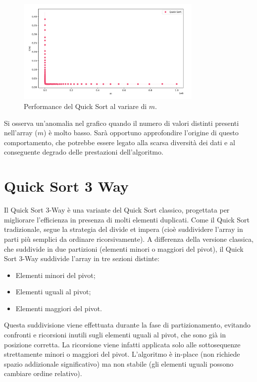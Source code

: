 \documentclass[a4paper, 12pt, oneside]{book}
\begin{document}
\begin{figure}[H]
    \centering
    \includegraphics[width=0.8\textwidth]{images/grafico_quick_sort_m.png}
    \caption{Performance del Quick Sort al variare di \(m\).}
    \label{fig:quick_sort_m}
\end{figure}

\noindent Si osserva un'anomalia nel grafico quando il numero di valori distinti presenti nell'array (\(m\)) è molto basso. Sarà opportuno approfondire l'origine di questo comportamento, che potrebbe essere legato alla scarsa diversità dei dati e al conseguente degrado delle prestazioni dell'algoritmo.


\chapter{Quick Sort 3 Way}\label{chap:Quick Sort 3 Way} %

Il Quick Sort 3-Way è una variante del Quick Sort classico, progettata per migliorare l'efficienza in presenza di molti elementi duplicati. Come il Quick Sort tradizionale, segue la strategia del divide et impera (cioè suddividere l'array in parti più semplici da ordinare ricorsivamente).
A differenza della versione classica, che suddivide in due partizioni (elementi minori o maggiori del pivot), il Quick Sort 3-Way suddivide l'array in tre sezioni distinte:

\begin{itemize}
    \item Elementi minori del pivot;
    \item Elementi uguali al pivot;
    \item Elementi maggiori del pivot.
\end{itemize}

\noindent Questa suddivisione viene effettuata durante la fase di partizionamento, evitando confronti e ricorsioni inutili sugli elementi uguali al pivot, che sono già in posizione corretta. La ricorsione viene infatti applicata solo alle sottosequenze strettamente minori o maggiori del pivot.
L'algoritmo è in-place (non richiede spazio addizionale significativo) ma non stabile (gli elementi uguali possono cambiare ordine relativo).
\end{document}
